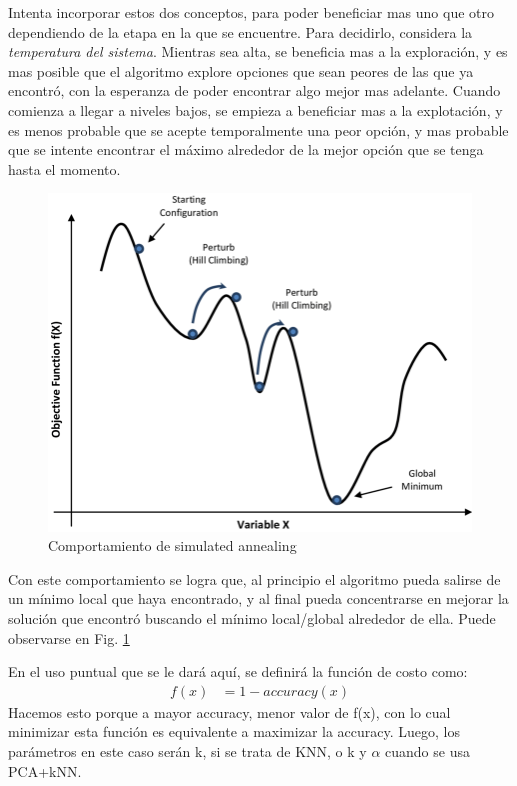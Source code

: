 \documentclass[a4paper]{article}
\begin{document}
        Intenta incorporar estos dos conceptos, para poder beneficiar mas uno que otro dependiendo de la etapa en la que se encuentre. Para decidirlo, considera la \textit{ temperatura del sistema}. Mientras sea alta, se beneficia mas a la exploración, y es mas posible que el algoritmo explore opciones que sean peores de las que ya encontró, con la esperanza de poder encontrar algo mejor mas adelante. Cuando comienza a llegar a niveles bajos, se empieza a beneficiar mas a la explotación, y es menos probable que se acepte temporalmente una peor opción, y mas probable que se intente encontrar el máximo alrededor de la mejor opción que se tenga hasta el momento. 
        
        \begin{figure}[H]
            \begin{center}
                \includegraphics[scale=0.3]{img/explicaciones/Simulated_Annealing.png}
                \caption{Comportamiento de simulated annealing}
                \label{fig:sim-ann}
            \end{center}
        \end{figure}
        
        Con este comportamiento se logra que, al principio el algoritmo pueda salirse de un mínimo local que haya encontrado, y al final pueda concentrarse en mejorar la solución que encontró buscando el mínimo local/global alrededor de ella. Puede observarse en Fig. \ref{fig:sim-ann}
       
        En el uso puntual que se le dará aquí, se definirá la función de costo como:
        \begin{align*}
        f(x) &= 1 - accuracy(x)
        \end{align*}
        Hacemos esto porque a mayor accuracy, menor valor de f(x), con lo cual minimizar esta función es equivalente a maximizar la accuracy. Luego, los parámetros en este caso serán k, si se trata de KNN, o k y $\alpha$ cuando se usa PCA+kNN.
\end{document}
